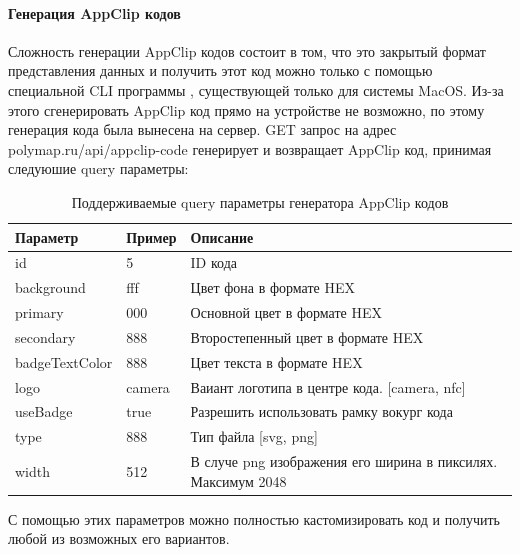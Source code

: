     \paragraph{Генерация AppClip кодов}
      Сложность генерации AppClip кодов состоит в том, что это закрытый формат представления данных и получить этот код можно только с помощью специальной CLI программы \cite{AppClipGenerator}, существующей только для системы MacOS. Из-за этого сгенерировать AppClip код прямо на устройстве не возможно, по этому генерация кода была вынесена на сервер. GET запрос на адрес polymap.ru/api/appclip-code генерирует и возвращает AppClip код, принимая следуюшие query параметры:
      \begin{center}
        \begin{xltabular}{\linewidth}{|l|p{3cm}|X|}
          \caption{Поддерживаемые query параметры генератора AppClip кодов}\\\hline
          Параметр       & Пример & Описание                                                     \\ \hline
          id             & 5      & ID кода                                                      \\ \hline
          background     & fff    & Цвет фона в формате HEX                                      \\ \hline
          primary        & 000    & Основной цвет в формате HEX                                  \\ \hline
          secondary      & 888    & Второстепенный цвет в формате HEX                            \\ \hline
          badgeTextColor & 888    & Цвет текста в формате HEX                                    \\ \hline
          logo           & camera & Ваиант логотипа в центре кода. [camera, nfc]                 \\ \hline
          useBadge       & true   & Разрешить использовать рамку вокург кода                     \\ \hline
          type           & 888    & Тип файла [svg, png]                                         \\ \hline
          width          & 512    & В случе png изображения его ширина в пиксилях. Максимум 2048 \\ \hline
        \end{xltabular}
      \end{center}


      С помощью этих параметров можно полностью кастомизировать код и получить любой из возможных его вариантов.

